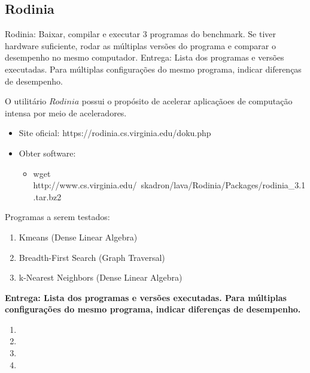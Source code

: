
\subsection{Rodinia}

Rodinia: Baixar, compilar e executar 3 programas do benchmark. Se tiver hardware suficiente, rodar as múltiplas versões do programa e comparar o desempenho no mesmo computador. Entrega: Lista dos programas e versões executadas. Para múltiplas configurações do mesmo programa, indicar diferenças de desempenho.

O utilitário $Rodinia$ possui o propósito de acelerar aplicaçãoes de computação intensa por meio de aceleradores.

\begin{itemize}
    \item Site oficial: https://rodinia.cs.virginia.edu/doku.php
    \item Obter software:
    \begin{itemize}
        \item wget http://www.cs.virginia.edu/~skadron/lava/Rodinia/Packages/rodinia\_3.1.tar.bz2
    \end{itemize}
\end{itemize}


Programas a serem testados:

\begin{enumerate}
    \item Kmeans (Dense Linear Algebra)
    \item Breadth-First Search (Graph Traversal)
    \item k-Nearest Neighbors (Dense Linear Algebra)
\end{enumerate}

\textbf{Entrega: Lista dos programas e versões executadas. Para múltiplas configurações do mesmo programa, indicar diferenças de desempenho.} \\

\begin{enumerate}
    \item  
    \item  
    \item  
    \item  
\end{enumerate}

